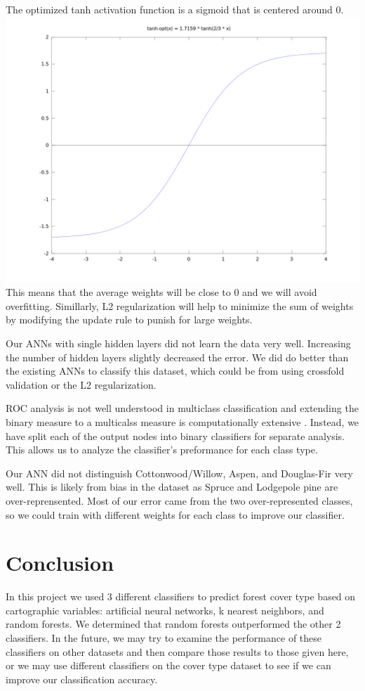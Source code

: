 \documentclass[11pt]{article}
\begin{document}
The optimized tanh activation function is a sigmoid that is centered around 0.\\
\includegraphics[width=\linewidth]{images/tanh}
This means that the average weights will be close to 0 and we will avoid overfitting.  Simillarly, L2 regularization will help to minimize the sum of weights by modifying the update rule to punish for large weights.  
\par
Our ANNs with single hidden layers did not learn the data very well.  Increasing the number of hidden layers slightly decreased the error.  We did do better than the existing ANNs to classify this dataset, which could be from using crossfold validation or the L2 regularization.  
\par
ROC analysis is not well understood in multiclass classification and extending the binary measure to a multicalss measure is computationally extensive \cite{lan07}.  Instead, we have split each of the output nodes into binary classifiers for separate analysis.  This allows us to analyze the classifier's preformance for each class type.
\par
Our ANN did not distinguish Cottonwood/Willow, Aspen, and Douglas-Fir very well.  This is likely from bias in the dataset as Spruce and Lodgepole pine are over-reprensented.  Most of our error came from the two over-represented classes, so we could train with different weights for each class to improve our classifier. 


\section{Conclusion}
In this project we used 3 different classifiers to predict forest cover type based on cartographic variables: artificial neural networks, k nearest neighbors, and random forests. We determined that random forests outperformed the other 2 classifiers. In the future, we may try to examine the performance of these classifiers on other datasets and then compare those results to those given here, or we may use different classifiers on the cover type dataset to see if we can improve our classification accuracy.
\end{document}
